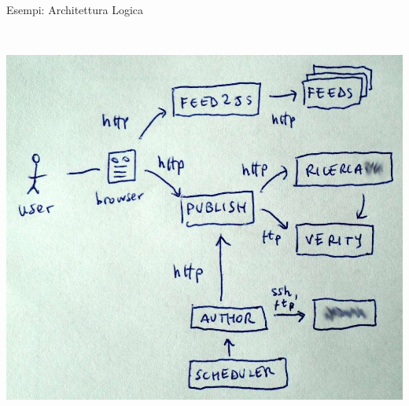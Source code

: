 \begin{frame}{Esempi: Architettura Logica}
\begin{columns}[T]
\begin{column}{.5\textwidth}
				\\ \vspace*{0.2cm}
				\hspace*{0.2cm} \includegraphics[scale=0.13]{images/architecture-4}
		    \end{column}
		 \end{columns}
	\end{frame}
	
